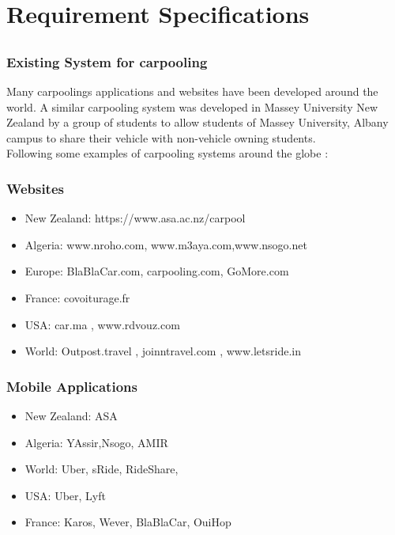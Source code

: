 \chapter{Requirement Specifications} \label{chap:reqs}

\section*{}
\subsection{Existing System for carpooling}
Many carpoolings applications and websites have been developed around the world. A similar carpooling system was developed in Massey University New Zealand by a group of students to allow students of Massey University, Albany campus to share their vehicle with non-vehicle owning students.
\\ Following some examples of carpooling systems around the globe : 
\subsection{Websites}
\begin{itemize}

\item New Zealand: https://www.asa.ac.nz/carpool
\item Algeria: www.nroho.com, www.m3aya.com,www.nsogo.net
\item Europe: BlaBlaCar.com, carpooling.com, GoMore.com
\item France: covoiturage.fr
\item USA: car.ma , www.rdvouz.com
\item World: Outpost.travel , joinntravel.com , www.letsride.in

\end{itemize}

\subsection{Mobile Applications}
\begin{itemize}

\item New Zealand: ASA
\item Algeria: YAssir,Nsogo, AMIR
\item World: Uber, sRide, RideShare, 
\item USA: Uber, Lyft
\item France: Karos, Wever, BlaBlaCar, OuiHop

\end{itemize}
